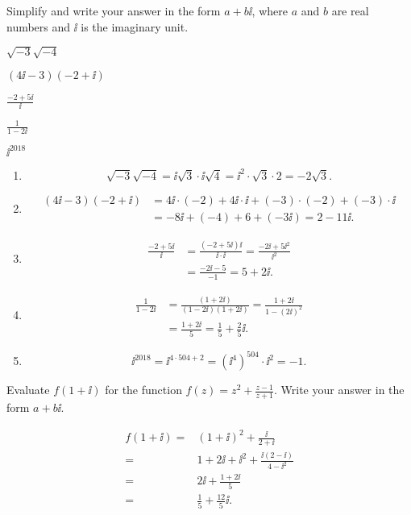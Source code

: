 	\begin{example}
		Simplify and write your answer in the form $a+b\ii$, where $a$ and $b$ are real numbers and $\ii$ is the imaginary unit.\\
		\begin{enumerate*}[label={(\arabic*)~}]
			\item $\sqrt{-3}\sqrt{-4}$
			\item $(4\ii-3)(-2+\ii)$
			\item $\frac{-2+5\ii}{\ii}$
			\item $\frac{1}{1-2\ii}$
			\item $\ii^{2018}$
			\hfill\null
		\end{enumerate*}
	\end{example}
	\begin{solution}\mbox{}\vspace{-0.25em}
		\begin{enumerate}[label=\emph{(\arabic*)~}]
			\item
			      \[
				      \sqrt{-3}\sqrt{-4}=\ii\sqrt{3}\cdot\ii\sqrt{4}=\ii^2\cdot \sqrt3\cdot 2=-2\sqrt{3}.
			      \]
			\item
			      \[
				      \begin{split}
					      (4\ii-3)(-2+\ii)&=4\ii\cdot(-2)+4\ii\cdot \ii+(-3)\cdot(-2)+(-3)\cdot\ii \\
					      &=-8\ii+(-4)+6+(-3\ii)=2-11\ii.
				      \end{split}
			      \]
			\item
			      \[
				      \begin{split}
					      \frac{-2+5\ii}{\ii}&=\frac{(-2+5\ii)\ii}{\ii\cdot \ii}=\frac{-2\ii+5\ii^2}{\ii^2}\\
					      &=\frac{-2\ii-5}{-1}=5+2\ii.
				      \end{split}
			      \]
			\item
			      \[
				      \begin{split}
					      \frac{1}{1-2\ii}&=\frac{(1+2\ii)}{(1-2\ii)(1+2\ii)}=\frac{1+2\ii}{1-(2\ii)^2}\\
					      &=\frac{1+2\ii}{5}=\frac{1}{5}+\frac{2}{5}\ii.
				      \end{split}
			      \]
			\item
			      \[
				      \ii^{2018}=\ii^{4\cdot 504+2}=(\ii^4)^{504}\cdot \ii^2=-1.
			      \]
			      \hfill\null
		\end{enumerate}
	\end{solution}


\begin{example}
	Evaluate $f(1+\ii)$ for the function $f(z)=z^2+\frac{z-1}{z+1}$. Write your answer in the form $a+b\ii$.
\end{example}
\begin{solution}
	\[
		\begin{aligned}
			f(1+\ii)=&(1+\ii)^2+\frac{\ii}{2+\ii}\\
			=&1+2\ii+\ii^2+\frac{\ii(2-\ii)}{4-\ii^2}\\
			=&2\ii+\frac{1+2\ii}{5}\\
			=&\frac15+\frac{12}{5}\ii.
		\end{aligned}
	\]
\end{solution}

